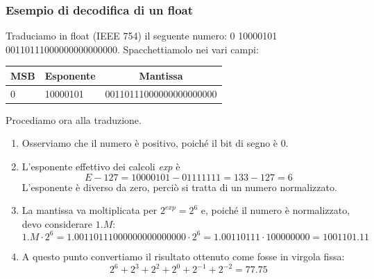 \documentclass[class=book, crop=false]{standalone}
\begin{document}
\subsubsection{Esempio di decodifica di un float}
Traduciamo in float (IEEE 754) il seguente numero: 0 10000101 00110111000000000000000.
Spacchettiamolo nei vari campi:
\begin{table}[h!]
	\centering
	\begin{tabular}{|l|l|l|}
		\hline
		\multicolumn{1}{|c|}{MSB} & \multicolumn{1}{c|}{Esponente} & \multicolumn{1}{c|}{Mantissa} \\ \hline
		0                & 10000101                  & 00110111000000000000000                    \\ \hline
	\end{tabular}
\end{table}
Procediamo ora alla traduzione.
\begin{enumerate}
	\item Osserviamo che il numero è positivo, poiché il bit di segno è 0.
	\item L'esponente effettivo dei calcoli \emph{exp} è
	\begin{equation*}
		E - 127 = 10000101 - 01111111 = 133 - 127 = 6
	\end{equation*}
	L'esponente è diverso da zero, perciò si tratta di un numero normalizzato.
	\item La mantissa va moltiplicata per $2^{exp} = 2^{6}$ e, poiché il numero è normalizzato, devo considerare $1.M$:
	\begin{equation*}
		1.M \cdot 2^{6} = 1.00110111000000000000000 \cdot 2^{6} = 1.00110111 \cdot 100000000 = 1001101.11
	\end{equation*}
	\item A questo punto convertiamo il risultato ottenuto come fosse in virgola fissa:
	\begin{equation*}
		2^{6} + 2^{3} + 2^{2} + 2^{0} + 2^{-1} + 2^{-2} = 77.75
	\end{equation*}
\end{enumerate}
\end{document}
